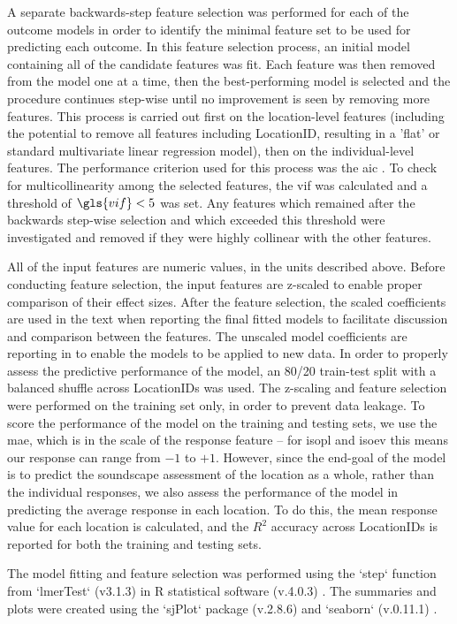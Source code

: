    A separate backwards-step feature selection was performed for each of the outcome models in order to identify the minimal feature set to be used for predicting each outcome. In this feature selection process, an initial model containing all of the candidate features was fit. Each feature was then removed from the model one at a time, then the best-performing model is selected and the procedure continues step-wise until no improvement is seen by removing more features. This process is carried out first on the location-level features (including the potential to remove all features including LocationID, resulting in a 'flat' or standard multivariate linear regression model), then on the individual-level features. The performance criterion used for this process was the \gls{aic} \citep{Akaike1974New}. To check for multicollinearity among the selected features, the \gls{vif} was calculated and a threshold of $\gls{vif} < 5$ was set. Any features which remained after the backwards step-wise selection and which exceeded this threshold were investigated and removed if they were highly collinear with the other features.

   All of the input features are numeric values, in the units described above. Before conducting feature selection, the input features are z-scaled to enable proper comparison of their effect sizes. After the feature selection, the scaled coefficients are used in the text when reporting the final fitted models to facilitate discussion and comparison between the features. The unscaled model coefficients are reporting in  to enable the models to be applied to new data. In order to properly assess the predictive performance of the model, an 80/20 train-test split with a balanced shuffle across LocationIDs was used. The z-scaling and feature selection were performed on the training set only, in order to prevent data leakage. To score the performance of the model on the training and testing sets, we use the \gls{mae}, which is in the scale of the response feature -- for \gls{isopl} and \gls{isoev} this means our response can range from $-1$ to $+1$. However, since the end-goal of the model is to predict the soundscape assessment of the location as a whole, rather than the individual responses, we also assess the performance of the model in predicting the average response in each location. To do this, the mean response value for each location is calculated, and the $R^2$ accuracy across LocationIDs is reported for both the training and testing sets.

   The model fitting and feature selection was performed using the `step` function from `lmerTest` (v3.1.3) \citep{Kuznetsova2017lmerTest} in R statistical software (v.4.0.3) \citep{RCT2021R}. The summaries and plots were created using the `sjPlot` package (v.2.8.6) \citep{Luedecke2021sjPlot} and `seaborn` (v.0.11.1) \citep{Waskom2021seaborn}.

